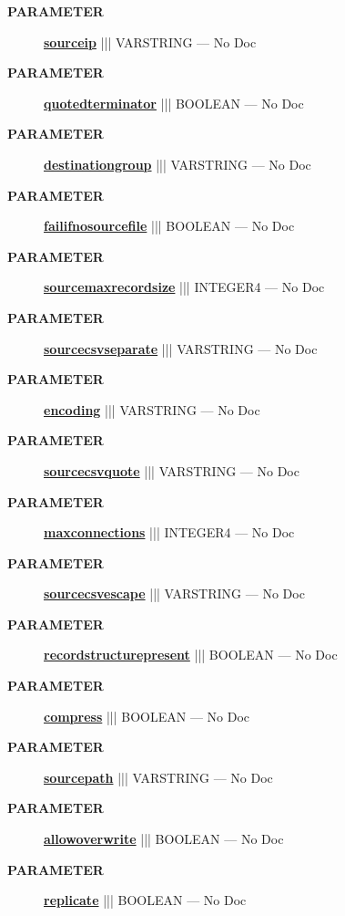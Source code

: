\par
\begin{description}
\item [\colorbox{tagtype}{\color{white} \textbf{\textsf{PARAMETER}}}] \textbf{\underline{sourceip}} ||| VARSTRING --- No Doc
\item [\colorbox{tagtype}{\color{white} \textbf{\textsf{PARAMETER}}}] \textbf{\underline{quotedterminator}} ||| BOOLEAN --- No Doc
\item [\colorbox{tagtype}{\color{white} \textbf{\textsf{PARAMETER}}}] \textbf{\underline{destinationgroup}} ||| VARSTRING --- No Doc
\item [\colorbox{tagtype}{\color{white} \textbf{\textsf{PARAMETER}}}] \textbf{\underline{failifnosourcefile}} ||| BOOLEAN --- No Doc
\item [\colorbox{tagtype}{\color{white} \textbf{\textsf{PARAMETER}}}] \textbf{\underline{sourcemaxrecordsize}} ||| INTEGER4 --- No Doc
\item [\colorbox{tagtype}{\color{white} \textbf{\textsf{PARAMETER}}}] \textbf{\underline{sourcecsvseparate}} ||| VARSTRING --- No Doc
\item [\colorbox{tagtype}{\color{white} \textbf{\textsf{PARAMETER}}}] \textbf{\underline{encoding}} ||| VARSTRING --- No Doc
\item [\colorbox{tagtype}{\color{white} \textbf{\textsf{PARAMETER}}}] \textbf{\underline{sourcecsvquote}} ||| VARSTRING --- No Doc
\item [\colorbox{tagtype}{\color{white} \textbf{\textsf{PARAMETER}}}] \textbf{\underline{maxconnections}} ||| INTEGER4 --- No Doc
\item [\colorbox{tagtype}{\color{white} \textbf{\textsf{PARAMETER}}}] \textbf{\underline{sourcecsvescape}} ||| VARSTRING --- No Doc
\item [\colorbox{tagtype}{\color{white} \textbf{\textsf{PARAMETER}}}] \textbf{\underline{recordstructurepresent}} ||| BOOLEAN --- No Doc
\item [\colorbox{tagtype}{\color{white} \textbf{\textsf{PARAMETER}}}] \textbf{\underline{compress}} ||| BOOLEAN --- No Doc
\item [\colorbox{tagtype}{\color{white} \textbf{\textsf{PARAMETER}}}] \textbf{\underline{sourcepath}} ||| VARSTRING --- No Doc
\item [\colorbox{tagtype}{\color{white} \textbf{\textsf{PARAMETER}}}] \textbf{\underline{allowoverwrite}} ||| BOOLEAN --- No Doc
\item [\colorbox{tagtype}{\color{white} \textbf{\textsf{PARAMETER}}}] \textbf{\underline{replicate}} ||| BOOLEAN --- No Doc

\end{description}
